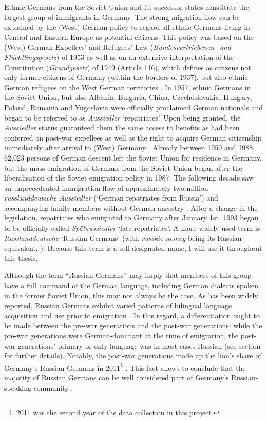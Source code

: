 Ethnic Germans from the Soviet Union and its successor states constitute the largest group of immigrants in Germany. The strong migration flow can be explained by the (West) German policy to regard all ethnic Germans living in Central and Eastern Europe as potential citizens. This policy was based on the (West) German Expellees' and Refugees' Law (\textit{Bundesvertriebenen- und Flüchtlingsgesetz}) of 1953 as well as on an extensive interpretation of the Constitution (\textit{Grundgesetz}) of 1949 (Article 116), which defines as citizens not only former citizens of Germany (within the borders of 1937), but also ethnic German refugees on the West German territories \citep{muenz03}. In 1957, ethnic Germans in the Soviet Union, but also Albania, Bulgaria, China, Czechoslovakia, Hungary, Poland, Romania and Yugoslavia were officially proclaimed German nationals and began to be referred to as \textit{Aussiedler} `repatriates'. Upon being granted, the \textit{Aussiedler} status guaranteed them the same access to benefits as had been conferred on post-war expellees as well as the right to acquire German citizenship immediately after arrival to (West) Germany \citep{muenz03}. Already between 1950 and 1988, 62,023 persons of German descent left the Soviet Union for residence in Germany, but the mass emigration of Germans from the Soviet Union began after the liberalisation of the Soviet emigration policy in 1987. The following decade saw an unprecedented immigration flow of approximately two million \textit{russlanddeutsche Aussiedler} (`German repatriates from Russia') and accompanying family members without German ancestry \citep{lederer97}. After a change in the legislation, repatriates who emigrated to Germany after January 1st, 1993 began to be officially called \textit{Spätaussiedler} `late repatriates'. A more widely used term is \textit{Russlanddeutsche} `Russian Germans' (with \textit{russkie nemcy} being its Russian equivalent, \citealt[cf.][]{meng-protas}). Because this term is a self-designated name, I will use it throughout this thesis.

Although the term “Russian Germans” may imply that members of this group have a full command of the German language, including German dialects spoken in the former Soviet Union, this may not always be the case. As has been widely reported, Russian Germans exhibit varied patterns of bilingual language acquisition and use prior to emigration \citep{berend98,meng01,riehlTA,worbs-etal-13}. In this regard, a differentiation ought to be made between the pre-war generations and the post-war generations: while the pre-war generations were German-dominant at the time of emigration, the post-war generations' primary or only language was in most cases Russian (see section  for further details). Notably, the post-war generations made up the lion's share of Germany's Russian Germans in 2011\footnote{2011 was the second year of the data collection in this project.} \citep[41]{worbs-etal-13}. This fact allows to conclude that the majority of Russian Germans can be well considered part of Germany's Russian-speaking community \citep[cf.][]{meng01,roll03,brehmer07}.

